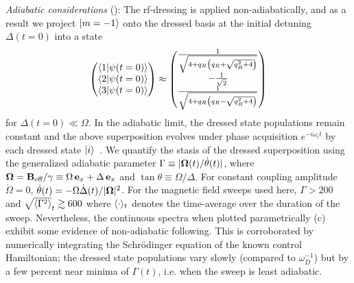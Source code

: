 \documentclass[aps,prl,reprint,superscriptaddress,floatfix]{revtex4-1}
\begin{document}
\textit{Adiabatic considerations} (\checkmark):
The rf-dressing is applied non-adiabatically, and as a result we project $\vert m=-1 \rangle $ onto the dressed basis at the initial detuning $\Delta(t=0)$ into a state
\begin{equation*}
    \begin{pmatrix}
        \langle 1 \vert \psi(t=0) \rangle  \\
        \langle 2 \vert \psi(t=0) \rangle  \\
        \langle 3 \vert \psi(t=0) \rangle  
    \end{pmatrix} \approx 
    \begin{pmatrix}
        \frac{1}{\sqrt{4 + q_R \left(q_R + \sqrt{q_R^2+4}\right)}} \\
        -\frac{1}{\sqrt{2}} \\
        \frac{1}{\sqrt{4 + q_R \left(q_R - \sqrt{q_R^2+4}\right)}}
    \end{pmatrix}
\end{equation*}
for $\Delta(t=0) \ll \Omega$.
In the adiabatic limit, the dressed state populations remain constant and the above superposition evolves under phase acquisition $e^{-i \omega_i t}$ by each dressed state $\vert i \rangle $~\cite{messiah_quantum_1962}. 
We quantify the stasis of the dressed superposition using the generalized adiabatic parameter $\Gamma \equiv \vert \mathbf{\Omega}(t)/\dot{\theta}(t) \vert $, where $\mathbf{\Omega} = \mathbf{B}_{\text{eff}} / \gamma \equiv \Omega \, \mathbf{e}_x + \Delta \, \mathbf{e}_x$ and $\tan \theta \equiv \Omega / \Delta$.
For constant coupling amplitude $\dot{\Omega} = 0$, $\dot{\theta}(t) = -\Omega \dot{\Delta}(t)/\vert \mathbf{\Omega} \vert ^2$.
For the magnetic field sweeps used here, $\Gamma > 200$ and $\sqrt{\langle \Gamma^2 \rangle}_t \gtrsim 600$ where $\langle \cdot \rangle_t$ denotes the time-average over the duration of the sweep.
Nevertheless, the continuous spectra when plotted parametrically (c) exhibit some evidence of non-adiabatic following.
This is corroborated by numerically integrating the Schr\"{o}dinger equation of the known control Hamiltonian; the dressed state populations vary slowly (compared to $\omega_D^{-1}$) but by a few percent near minima of $\Gamma(t)$, i.e. when the sweep is least adiabatic.
\end{document}
